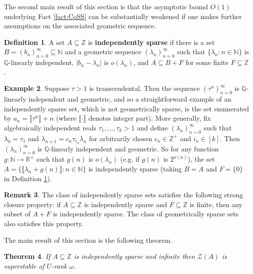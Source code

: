\documentclass{amsart}
\def\seq{\subseteq}
\newcommand{\cZ}{\mathcal{Z}}
\def\N{\mathbb N}
\def\Q{\mathbb Q}
\def\R{\mathbb R}
\def\Z{\mathbb Z}
\newtheorem{theorem}{Theorem}[section]
\theoremstyle{definition}
\newtheorem{definition}[theorem]{Definition}
\newtheorem{example}[theorem]{Example}
\newtheorem{remark}[theorem]{Remark}
\begin{document}
The second main result of this section is that the asymptotic bound $O(1)$ underlying Fact \ref{fact:CoSS} can be substantially weakened if one makes further assumptions on the associated geometric sequence. 



\begin{definition}\label{def:IS}
A set $A\seq\Z$ is \textbf{independently sparse} if there is a set $B=(b_n)_{n=0}^\infty\seq\N$ and a geometric sequence $(\lambda_n)_{n=0}^\infty$ such that $\{\lambda_n:n\in\N\}$ is $\Q$-linearly independent, $|b_n-\lambda_n|$ is $o(\lambda_n)$, and $A\seq B+F$ for some finite $F\seq\Z$.
\end{definition}



\begin{example}\label{ex:IS}
Suppose $\tau>1$ is transcendental. Then the sequence $(\tau^n)_{n=0}^\infty$ is $\Q$-linearly independent and geometric, and so a straightforward example of an independently sparse set, which is not geometrically sparse, is the set enumerated by $a_n=\llbracket\tau^n\rrbracket+n$ (where $\llbracket\cdot \rrbracket$ denotes integer part). More generally, fix algebraically independent reals $\tau_1,\ldots,\tau_k>1$ and define $(\lambda_n)_{n=0}^\infty$ such that $\lambda_0=\tau_1$ and $\lambda_{n+1}=c_n\tau_{i_n}\lambda_n$ for arbitrarily chosen $c_n\in\Z^+$ and $i_n\in[k]$. Then $(\lambda_n)_{n=0}^\infty$ is $\Q$-linearly independent and geometric. So for any function $g\colon\N\to\R^+$ such that $g(n)$ is $o(\lambda_n)$ (e.g. if $g(n)$ is $2^{o(n)}$), the set $A=\{\llbracket\lambda_n+g(n)\rrbracket:n\in\N\}$ is independently sparse (taking $B=A$ and $F=\{0\}$ in Definition \ref{def:IS}). 
\end{example}




\begin{remark}
The class of independently sparse sets satisfies the following strong closure property: if $A\seq\Z$ is independently sparse and $F\seq\Z$ is finite, then any subset of $A+F$ is independently sparse. The class of geometrically sparse sets also satisfies this property.
\end{remark}

The main result of this section is the following theorem.

\begin{theorem}\label{thm:IS}
If $A\seq\Z$ is independently sparse and infinite then $\cZ(A)$ is superstable of $U$-rank $\omega$.
\end{theorem}
\end{document}
